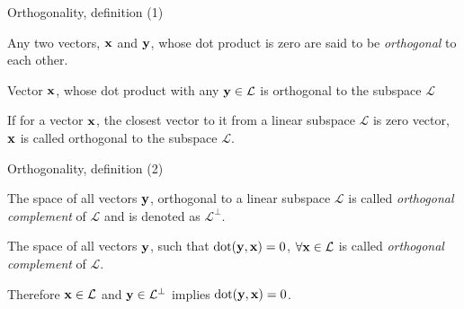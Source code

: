 \documentclass{beamer}
\begin{document}
\begin{frame}{Orthogonality, definition (1)}
	\begin{flushleft}
		
		\begin{definition}
			Any two vectors, $\mathbf{x}$ and $\mathbf{y}$, whose dot product is zero are said to be \emph{orthogonal} to each other.
		\end{definition}
		
		\begin{definition}
			Vector $\mathbf{x}$, whose dot product with any $\mathbf{y} \in \mathcal{L}$ is orthogonal to the subspace $\mathcal{L}$
		\end{definition}
		
		\begin{definition}[equivalent]
			If for a vector $\mathbf{x}$, the closest vector to it from a linear subspace $\mathcal{L}$ is zero vector, $\mathbf{x}$ is called orthogonal to the subspace $\mathcal{L}$.
		\end{definition}
		
		
	\end{flushleft}
\end{frame}


\begin{frame}{Orthogonality, definition (2)}
	\begin{flushleft}
		
		\begin{definition}
			The space of all vectors $\mathbf{y}$, orthogonal to a linear subspace $\mathcal{L}$ is called \emph{orthogonal complement} of $\mathcal{L}$ and is denoted as $\mathcal{L}^\perp$.
		\end{definition}
		
		
		\begin{definition}[equivalent]
			The space of all vectors $\mathbf{y}$, such that $\text{dot}(\mathbf{y}, \mathbf{x}) = 0$, $\forall \mathbf{x} \in \mathcal{L}$ is called \emph{orthogonal complement} of $\mathcal{L}$.
		\end{definition}
		
		Therefore $\mathbf{x} \in \mathcal{L}$ and $\mathbf{y} \in \mathcal{L}^\perp$ implies $\text{dot}(\mathbf{y}, \mathbf{x}) = 0$.
		
	\end{flushleft}
\end{frame}
\end{document}
